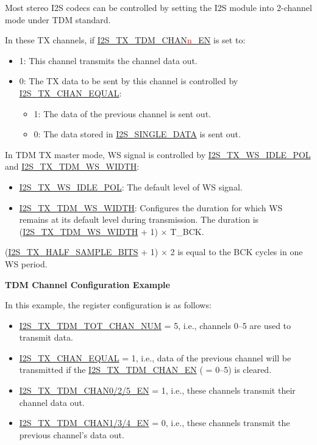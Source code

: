 \documentclass[main\_\_EN.tex]{subfiles}
\begin{document}
\vspace{-1em}
\begin{tiplisting}
Most stereo I2S codecs can be controlled by setting the I2S module into 2-channel mode under TDM standard.
\end{tiplisting}

In these TX channels, if \hyperref[fielddesc:I2STXTDMCHAN0EN]{I2S\_TX\_TDM\_CHAN{\textcolor{red}{n}}\_EN} is set to:

\begin{itemize}
    \item 1: This channel transmits the channel data out.
    \item 0: The TX data to be sent by this channel is controlled by \hyperref[fielddesc:I2STXCHANEQUAL]{I2S\_TX\_CHAN\_EQUAL}:
    \begin{itemize}
        \item 1: The data of the previous channel is sent out.
        \item 0: The data stored in \hyperref[fielddesc:I2SSINGLEDATA]{I2S\_SINGLE\_DATA} is sent out.
    \end{itemize}
\end{itemize}

In TDM TX master mode, WS signal is controlled by \hyperref[fielddesc:I2STXWSIDLEPOL]{I2S\_TX\_WS\_IDLE\_POL} and \hyperref[fielddesc:I2STXTDMWSWIDTH]{I2S\_TX\_TDM\_WS\_WIDTH}:
\begin{itemize}
    \item \hyperref[fielddesc:I2STXWSIDLEPOL]{I2S\_TX\_WS\_IDLE\_POL}: The default level of WS signal.
    \item \hyperref[fielddesc:I2STXTDMWSWIDTH]{I2S\_TX\_TDM\_WS\_WIDTH}: Configures the duration for which WS remains at its default level during transmission. The duration is (\hyperref[fielddesc:I2STXTDMWSWIDTH]{I2S\_TX\_TDM\_WS\_WIDTH} + 1) × T\_BCK.
\end{itemize}

(\hyperref[fielddesc:I2STXHALFSAMPLEBITS]{I2S\_TX\_HALF\_SAMPLE\_BITS} + 1) × 2 is equal to the BCK cycles in one WS period.

\textbf{TDM Channel Configuration Example}

In this example, the register configuration is as follows:

\begin{itemize}
    \item \hyperref[fielddesc:I2STXTDMTOTCHANNUM]{I2S\_TX\_TDM\_TOT\_CHAN\_NUM} = 5, i.e., channels 0--5 are used to transmit data.
    \item \hyperref[fielddesc:I2STXCHANEQUAL]{I2S\_TX\_CHAN\_EQUAL} = 1, i.e., data of the previous channel will be transmitted if the \hyperref[fielddesc:I2STXTDMCHAN0EN]{I2S\_TX\_TDM\_CHAN\_EN} ( = 0--5) is cleared.
    \item \hyperref[fielddesc:I2STXTDMCHAN0EN]{I2S\_TX\_TDM\_CHAN0/2/5\_EN} = 1, i.e., these channels transmit their channel data out.
    \item \hyperref[fielddesc:I2STXTDMCHAN0EN]{I2S\_TX\_TDM\_CHAN1/3/4\_EN} = 0, i.e., these channels transmit the previous channel's data out.
\end{itemize}
\end{document}
